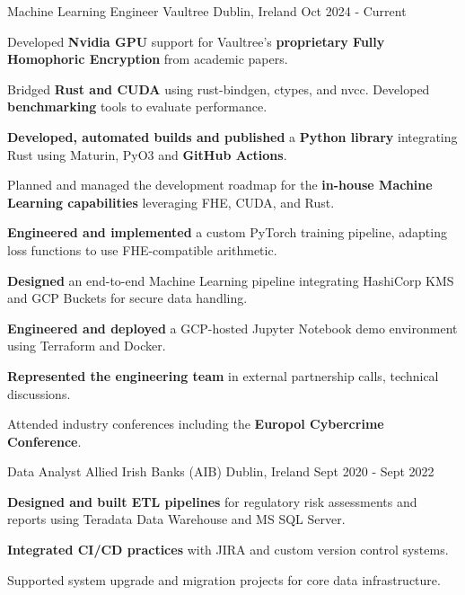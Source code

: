 

\begin{cventries}

\cventry
  {Machine Learning Engineer} %
  {Vaultree} %
  {Dublin, Ireland} %
  {Oct 2024 - Current} %
  {
    \begin{cvitems} %
      \item {Developed \textbf{Nvidia GPU} support for Vaultree's \textbf{proprietary Fully Homophoric Encryption} from academic papers.}
      \item {Bridged \textbf{Rust and CUDA} using rust-bindgen, ctypes, and nvcc. Developed \textbf{benchmarking} tools to evaluate performance.}
      \item {\textbf{Developed, automated builds and published} a \textbf{Python library} integrating Rust using Maturin, PyO3 and \textbf{GitHub Actions}.}
      \item {Planned and managed the development roadmap for the \textbf{in-house Machine Learning capabilities} leveraging FHE, CUDA, and Rust.}
      \item {\textbf{Engineered and implemented} a custom PyTorch training pipeline, adapting loss functions to use FHE-compatible arithmetic.}
      \item {\textbf{Designed} an end-to-end Machine Learning pipeline integrating HashiCorp KMS and GCP Buckets for secure data handling.}
      \item {\textbf{Engineered and deployed} a GCP-hosted Jupyter Notebook demo environment using Terraform and Docker.}
      \item {\textbf{Represented the engineering team} in external partnership calls, technical discussions.}
      \item {Attended industry conferences including the \textbf{Europol Cybercrime Conference}.}
    \end{cvitems}
  }

\cventry
  {Data Analyst} %
  {Allied Irish Banks (AIB)} %
  {Dublin, Ireland} %
  {Sept 2020 - Sept 2022} %
  {
    \begin{cvitems}
      \item {\textbf{Designed and built ETL pipelines} for regulatory risk assessments and reports using Teradata Data Warehouse and MS SQL Server.}
      \item {\textbf{Integrated CI/CD practices} with JIRA and custom version control systems.}
      \item {Supported system upgrade and migration projects for core data infrastructure.}
    \end{cvitems}
  }

\end{cventries}